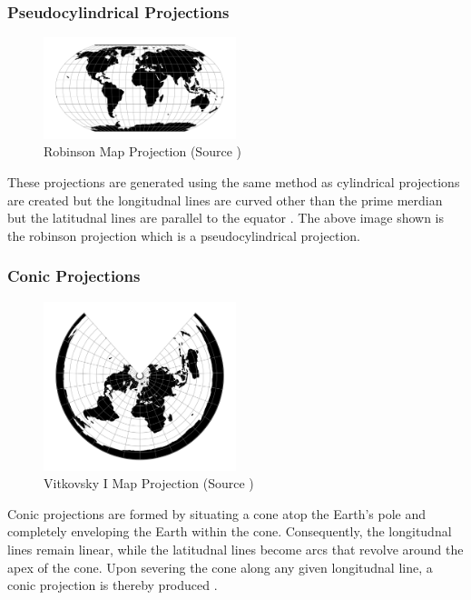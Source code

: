 \subsubsection{Pseudocylindrical Projections}

\begin{figure}[h]
    \centering
    \includegraphics[width=0.5\textwidth]{figures/chapter-1/robinson.png}
    \caption{Robinson Map Projection (Source \cite{PROJ_SITE})}
    \label{fig:robinson-image}
\end{figure}


These projections are generated using the same method as cylindrical projections are created but the longitudnal lines are curved other than the prime merdian but the latitudnal lines are parallel to the equator \cite{GISGEO_Cylinder}.
The above image shown is the robinson projection which is a pseudocylindrical projection.

\subsubsection{Conic Projections}

\begin{figure}[h]
    \centering
    \includegraphics[width=0.5\textwidth]{figures/chapter-3/vitk1.png}
    \caption{Vitkovsky I Map Projection (Source \cite{PROJ_SITE})}
    \label{fig:vitkovsky-image}
\end{figure}
Conic projections are formed by situating a cone atop the Earth's pole and completely enveloping the Earth within the cone. Consequently, the longitudnal lines remain linear, while the latitudnal lines become arcs that revolve around the apex of the cone. Upon severing the cone along any given longitudnal line, a conic projection is thereby produced \cite{Snyder1982}.

